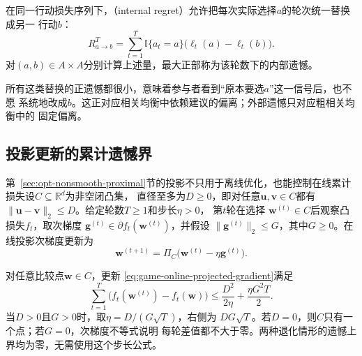 \begin{definition}[内部遗憾]
\label{def:game-internal-regret}
在同一行动损失序列下，（internal regret）允许把每次实际选择\(a\)的轮次统一替换成另一
行动\(b\)：
\[
  R_{a\to b}^T
  =
  \sum_{t=1}^{T}
  \mathbb{I}\{a_t=a\}
  \bigl(\ell_t(a)-\ell_t(b)\bigr).
\]
对$(a,b)\in A\times A$分别计算上述量，最大正部称为该轮数下的内部遗憾。
\end{definition}
所有这类替换的正遗憾都很小，意味着参与者看到“原本要选\(a\)”这一信号后，也不愿
系统地改成\(b\)。这正对应相关均衡中依赖建议的偏离；外部遗憾只对应粗相关均衡中的
固定偏离。

\subsection{投影更新的累计遗憾界}

第~\ref{sec:opt-nonsmooth-proximal}节的投影不只用于离线优化，也能控制在线累计
损失设\(C\subseteq\mathbb{R}^d\)为非空闭凸集，
直径至多为\(D\geq0\)，即对任意\(\bm{u},\bm{v}\in C\)都有
\(\lVert\bm{u}-\bm{v}\rVert_2\leq D\)。给定轮数\(T\geq1\)和步长\(\eta>0\)，
第\(t\)轮在选择
\(\bm{w}^{(t)}\in C\)后观察凸损失\(f_t\)，取次梯度
\(\bm{g}^{(t)}\in\partial f_t(\bm{w}^{(t)})\)，并假设
\(\lVert\bm{g}^{(t)}\rVert_2\leq G\)，其中\(G\geq0\)。在线投影次梯度更新为
\begin{equation}
  \bm{w}^{(t+1)}
  =
  \Pi_C\bigl(
    \bm{w}^{(t)}-\eta\bm{g}^{(t)}
  \bigr).
  \label{eq:game-online-projected-gradient}
\end{equation}

\begin{theorem}[在线投影次梯度的外部遗憾]
\label{thm:game-online-gradient-regret}
对任意比较点\(\bm{w}\in C\)，更新
\eqref{eq:game-online-projected-gradient}满足
\begin{equation}
  \sum_{t=1}^{T}
  \bigl(
    f_t(\bm{w}^{(t)})-f_t(\bm{w})
  \bigr)
  \leq
  \frac{D^2}{2\eta}
  +\frac{\eta G^2T}{2}.
  \label{eq:game-online-gradient-regret-bound}
\end{equation}
当\(D>0\)且\(G>0\)时，取\(\eta=D/(G\sqrt{T})\)，右侧为
\(DG\sqrt{T}\)。若\(D=0\)，则\(C\)只有一个点；若\(G=0\)，次梯度不等式说明
每轮差值都不大于零。两种退化情形的遗憾上界均为零，无需使用这个步长公式。
\end{theorem}

